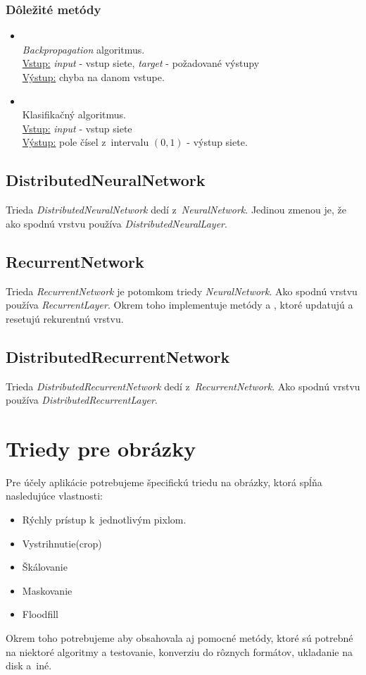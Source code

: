 \subsubsection{Dôležité metódy}
\begin{itemize}
\item {}
\\\textit{Backpropagation} algoritmus.
\\ \underline{Vstup:} \textit{input} - vstup siete, \textit{target} - požadované výstupy 
\\ \underline{Výstup:} chyba na danom vstupe.
\item {}
\\ Klasifikačný algoritmus.
\\ \underline{Vstup:} \textit{input} - vstup siete
\\ \underline{Výstup:} pole čísel z~intervalu $(0,1)$ - výstup siete.
\end{itemize}

\subsection{DistributedNeuralNetwork}
Trieda \textit{DistributedNeuralNetwork} dedí z~\textit{NeuralNetwork}. Jedinou zmenou je, že ako spodnú vrstvu používa \textit{DistributedNeuralLayer}.

\subsection{RecurrentNetwork}
Trieda \textit{RecurrentNetwork} je potomkom triedy \textit{NeuralNetwork}. Ako spodnú vrstvu používa \textit{RecurrentLayer}. Okrem toho implementuje metódy  a , ktoré updatujú a resetujú rekurentnú vrstvu.

\subsection{DistributedRecurrentNetwork}
Trieda \textit{DistributedRecurrentNetwork} dedí z~\textit{RecurrentNetwork}. Ako spodnú vrstvu používa \textit{DistributedRecurrentLayer}.

\section{Triedy pre obrázky}

Pre účely aplikácie potrebujeme špecifickú triedu na obrázky, ktorá spĺňa nasledujúce vlastnosti:
\begin{itemize}
\item Rýchly prístup k~jednotlivým pixlom.
\item Vystrihnutie(crop)
\item Škálovanie
\item Maskovanie
\item Floodfill
\end{itemize}
Okrem toho potrebujeme aby obsahovala aj pomocné metódy, ktoré sú potrebné na niektoré algoritmy a testovanie, konverziu do rôznych formátov, ukladanie na disk a~iné.

